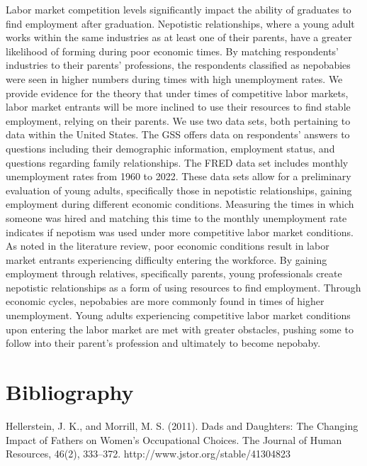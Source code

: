 \documentclass[12pt]{article}
\begin{document}
Labor market competition levels significantly impact the ability of graduates to find employment after graduation. Nepotistic relationships, where a young adult works within the same industries as at least one of their parents, have a greater likelihood of forming during poor economic times. By matching respondents’ industries to their parents’ professions, the respondents classified as nepobabies were seen in higher numbers during times with high unemployment rates. We provide evidence for the theory that under times of competitive labor markets, labor market entrants will be more inclined to use their resources to find stable employment, relying on their parents. 
We use two data sets, both pertaining to data within the United States. The GSS offers data on respondents' answers to questions including their demographic information, employment status, and questions regarding family relationships. The FRED data set includes monthly unemployment rates from 1960 to 2022. These data sets allow for a preliminary evaluation of young adults, specifically those in nepotistic relationships, gaining employment during different economic conditions.
Measuring the times in which someone was hired and matching this time to the monthly unemployment rate indicates if nepotism was used under more competitive labor market conditions. As noted in the literature review, poor economic conditions result in labor market entrants experiencing difficulty entering the workforce. By gaining employment through relatives, specifically parents, young professionals create nepotistic relationships as a form of using resources to find employment. Through economic cycles, nepobabies are more commonly found in times of higher unemployment. Young adults experiencing competitive labor market conditions upon entering the labor market are met with greater obstacles, pushing some to follow into their parent's profession and ultimately to become nepobaby. 



\newpage
\section*{Bibliography}
\singlespacing
\setlength\bibsep{1pt}

\hspace{1cm}Hellerstein, J. K., and Morrill, M. S. (2011). Dads and Daughters: The Changing Impact of Fathers on Women’s Occupational Choices. The Journal of Human Resources, 46(2), 333–372. http://www.jstor.org/stable/41304823
\end{document}

